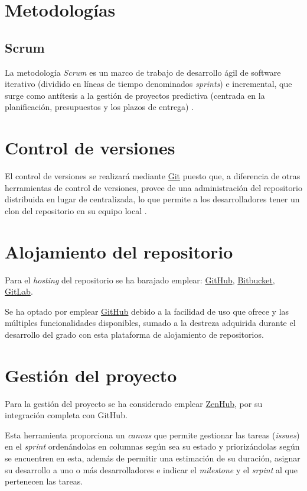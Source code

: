 
\section{Metodologías}
\subsection{Scrum}
La metodología \textit{Scrum} es un marco de trabajo de desarrollo ágil de software
iterativo (dividido en líneas de tiempo denominados \textit{sprints}) e incremental, 
que surge como antítesis a la gestión de proyectos predictiva (centrada en la planificación,
presupuestos y los plazos de entrega) \cite{enwiki:scrum2023,book:palacio2021}.

\section{Control de versiones}
El control de versiones se realizará mediante \href{https://git-scm.com/}{Git} puesto que, a 
diferencia de otras herramientas de control de versiones, provee de una administración del
repositorio distribuida en lugar de centralizada, lo que permite a los desarrolladores
tener un clon del repositorio en su equipo local \cite{git:2023}. 

\section{Alojamiento del repositorio}
Para el \textit{hosting} del repositorio se ha barajado emplear: \href{https://github.com/}{GitHub}, 
        \href{https://bitbucket.org/product/es/}{Bitbucket},
        \href{https://about.gitlab.com/}{GitLab}.

Se ha optado por emplear \href{https://github.com/}{GitHub} debido a la facilidad de uso
que ofrece y las múltiples funcionalidades disponibles, sumado a la destreza adquirida
durante el desarrollo del grado con esta plataforma de alojamiento de repositorios.

\section{Gestión del proyecto}
Para la gestión del proyecto se ha considerado emplear \href{https://www.zenhub.com/}{ZenHub},
por su integración completa con GitHub.

Esta herramienta proporciona un \textit{canvas} que permite gestionar las 
tareas (\textit{issues}) en el \textit{sprint} ordenándolas en columnas según sea su 
estado y priorizándolas según se encuentren en esta, además de permitir una 
estimación de su duración, asignar su desarrollo a uno o más
desarrolladores e indicar el \textit{milestone} y el \textit{srpint} al que pertenecen
las tareas.

